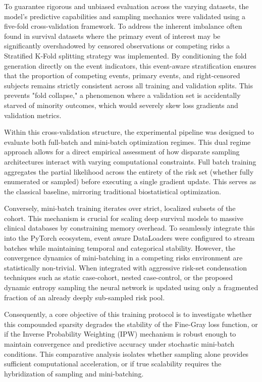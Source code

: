 \documentclass[a4paper,twoside,12pt]{report}
\begin{document}
To guarantee rigorous and unbiased evaluation across the varying datasets, the model's predictive capabilities and sampling mechanics were validated using a five-fold cross-validation framework. To address the inherent imbalance often found in survival datasets where the primary event of interest may be significantly overshadowed by censored observations or competing risks a Stratified K-Fold splitting strategy was implemented. By conditioning the fold generation directly on the event indicators, this event-aware stratification ensures that the proportion of competing events, primary events, and right-censored subjects remains strictly consistent across all training and validation splits. This prevents "fold collapse," a phenomenon where a validation set is accidentally starved of minority outcomes, which would severely skew loss gradients and validation metrics. 

Within this cross-validation structure, the experimental pipeline was designed to evaluate both full-batch and mini-batch optimization regimes. This dual regime approach allows for a direct empirical assessment of how disparate sampling architectures interact with varying computational constraints. Full batch training aggregates the partial likelihood across the entirety of the risk set (whether fully enumerated or sampled) before executing a single gradient update. This serves as the classical baseline, mirroring traditional biostatistical optimization. 

Conversely, mini-batch training iterates over strict, localized subsets of the cohort. This mechanism is crucial for scaling deep survival models to massive clinical databases by constraining memory overhead. To seamlessly integrate this into the PyTorch ecosystem, event aware DataLoaders were configured to stream batches while maintaining temporal and categorical stability. However, the convergence dynamics of mini-batching in a competing risks environment are statistically non-trivial. When integrated with aggressive risk-set condensation techniques such as static case-cohort, nested case-control, or the proposed dynamic entropy sampling the neural network is updated using only a fragmented fraction of an already deeply sub-sampled risk pool. 

Consequently, a core objective of this training protocol is to investigate whether this compounded sparsity degrades the stability of the Fine-Gray loss function, or if the Inverse Probability Weighting (IPW) mechanism is robust enough to maintain convergence and predictive accuracy under stochastic mini-batch conditions. This comparative analysis isolates whether sampling alone provides sufficient computational acceleration, or if true scalability requires the hybridization of sampling and mini-batching.
\end{document}
